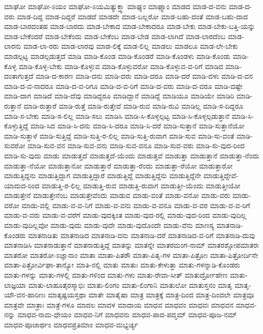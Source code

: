 {ಮಾಘೋ
ಮಾಘೋ-ಽಯಂ
ಮಾಘೋ-ಽಯಮಿತ್ಯುಕ್ತ್ವಾ
ಮಾಘ್ಯಂ
ಮಾಘ್ಯಾಂ
ಮಾಡದ
ಮಾಡ-ದ-ವನು
ಮಾಡ-ದ-ವರು
ಮಾಡ-ದಿದ್ದ
ಮಾಡ-ದಿದ್ದರೆ
ಮಾಡದೆ
ಮಾಡದೇ
ಮಾಡ-ಬಲ್ಲರೋ
ಮಾಡ-ಬಹು-ದಂತೆ
ಮಾಡ-ಬಹು-ದಾದ
ಮಾಡ-ಬಾರದಂತಹ
ಮಾಡ-ಬಾರದು
ಮಾಡ-ಬೇಕಾದ
ಮಾಡ-ಬೇಕಾದರೂ
ಮಾಡ-ಬೇಕು
ಮಾಡ-ಬೇಕು-ಬತ್ತಿ-ಯನ್ನು
ಮಾಡ-ಬೇಕೆಂದರೆ
ಮಾಡ-ಬೇಕೆಂದು
ಮಾಡ-ಬೇಕೆಂಬ
ಮಾಡ-ಬೇಡ
ಮಾಡ-ಲಾಗಿದೆ
ಮಾಡ-ಲಾರದೆಂಬ
ಮಾಡ-ಲಾರನು
ಮಾಡ-ಲಾ-ರರು
ಮಾಡ-ಲಾರವು
ಮಾಡ-ಲಿಕ್ಕೆ
ಮಾಡ-ಲಿಲ್ಲ
ಮಾಡಲು
ಮಾಡಲೂ
ಮಾಡ-ಲೇ-ಬೇಕು
ಮಾಡಲ್ಪಟ್ಟ
ಮಾಡಲ್ಪಡುತ್ತದೆ
ಮಾಡಿ
ಮಾಡಿ-ಕೊಂಡ
ಮಾಡಿ-ಕೊಂಡರೆ
ಮಾಡಿ-ಕೊಂಡಳು
ಮಾಡಿ-ಕೊಂಡು
ಮಾಡಿ-ಕೊಳ್ಳ
ಮಾಡಿ-ಕೊಳ್ಳ-ಬೇಕು
ಮಾಡಿ-ಕೊಳ್ಳುವ
ಮಾಡಿ-ಕೊಳ್ಳುವರೋ
ಮಾಡಿ-ಕೊಳ್ಳುವ-ವ-ರಿಗೆ
ಮಾಡಿದ
ಮಾಡಿ-ದಂತಾಗುತ್ತದೆ
ಮಾಡಿ-ದ-ಕಾರಣ
ಮಾಡಿ-ದನು
ಮಾಡಿ-ದರು
ಮಾಡಿ-ದರೂ
ಮಾಡಿ-ದರೆ
ಮಾಡಿ-ದಳು
ಮಾಡಿ-ದ-ವನ
ಮಾಡಿ-ದ-ವ-ನಾದರೂ
ಮಾಡಿ-ದ-ವ-ರಿಗೂ
ಮಾಡಿ-ದ-ವ-ರಿಗೆ
ಮಾಡಿ-ದ-ವರು
ಮಾಡಿ-ದ-ವರೂ
ಮಾಡಿ-ದಷ್ಟೇ
ಮಾಡಿ-ದಾಗ
ಮಾಡಿದೆ
ಮಾಡಿ-ದೆವು
ಮಾಡಿದ್ದರೂ
ಮಾಡಿದ್ದಾನೆ
ಮಾಡಿದ್ದೆ
ಮಾಡಿಯೂ
ಮಾಡಿಯೇ
ಮಾಡಿರಿ
ಮಾಡಿ-ರುತ್ತಾನೆ
ಮಾಡಿ-ರುತ್ತಾರೆ
ಮಾಡಿ-ರುತ್ತೆ
ಮಾಡಿ-ರುತ್ತೇವೆ
ಮಾಡಿ-ರುವ
ಮಾಡಿ-ರುವಿ
ಮಾಡಿಲ್ಲ
ಮಾಡಿ-ಸ-ದಿದ್ದರೂ
ಮಾಡಿ-ಸ-ಬೇಕು
ಮಾಡಿ-ಸ-ಲಿಲ್ಲ
ಮಾಡಿ-ಸಲು
ಮಾಡಿಸಿ
ಮಾಡಿ-ಸಿ-ಕೊಳ್ಳಲ್ಪಟ್ಟ
ಮಾಡಿ-ಸಿ-ಕೊಳ್ಳಲ್ಪಡುತ್ತಾನೆ
ಮಾಡಿ-ಸಿ-ಕೊಳ್ಳುತ್ತಿದ್ದೆ
ಮಾಡಿ-ಸಿದ
ಮಾಡಿ-ಸಿ-ದನು
ಮಾಡಿ-ಸಿ-ದರೂ
ಮಾಡಿ-ಸಿ-ದರೆ
ಮಾಡಿ-ಸುತ್ತಾನೆ
ಮಾಡಿ-ಸುತ್ತಾನೆಯೋ
ಮಾಡಿ-ಸುತ್ತಾಳೆ
ಮಾಡಿ-ಸುತ್ತಿದ್ದೆ
ಮಾಡಿ-ಸುತ್ತಿ-ರ-ಲಿಲ್ಲ
ಮಾಡಿ-ಸುತ್ತಿ-ರುವಾಗ
ಮಾಡಿ-ಸುವ
ಮಾಡಿ-ಸು-ವಂತೆ
ಮಾಡಿ-ಸುವರೋ
ಮಾಡಿ-ಸುವ-ವನ
ಮಾಡಿ-ಸುವ-ವನು
ಮಾಡಿ-ಸುವ-ವನೂ
ಮಾಡಿ-ಸುವ-ವರು
ಮಾಡಿ-ಸು-ವುದ-ರಿಂದ
ಮಾಡಿ-ಸು-ವುದು
ಮಾಡು
ಮಾಡುತ್ತದೆ
ಮಾಡುತ್ತದೆ-ಯೆಂದು
ಮಾಡುತ್ತವೆ
ಮಾಡುತ್ತಾ
ಮಾಡುತ್ತಾನೆ
ಮಾಡುತ್ತಾ-ನೆಂದು
ಮಾಡುತ್ತಾ-ನೆಯೋ
ಮಾಡುತ್ತಾನೋ
ಮಾಡುತ್ತಾರೆ
ಮಾಡುತ್ತಾ-ರೆಂದು
ಮಾಡುತ್ತಾ-ರೆಯೋ
ಮಾಡುತ್ತಾರೋ
ಮಾಡುತ್ತಿದ್ದನು
ಮಾಡುತ್ತಿದ್ದಾಗ
ಮಾಡುತ್ತಿದ್ದಾರೆ
ಮಾಡುತ್ತಿದ್ದೆ
ಮಾಡುತ್ತಿದ್ದೆನು
ಮಾಡುತ್ತಿದ್ದೆನೇ
ಮಾಡುತ್ತಿದ್ದೇವೆ-ಯಾದುದ-ರಿಂದ
ಮಾಡುತ್ತಿ-ರ-ಲಿಲ್ಲ
ಮಾಡುತ್ತಿ-ರುವ
ಮಾಡುತ್ತಿ-ರುವಾಗ
ಮಾಡುತ್ತೀ-ಯೆಂದು
ಮಾಡುತ್ತೀಯೋ
ಮಾಡುತ್ತೇನೆ
ಮಾಡುತ್ತೇನೆಂಬ
ಮಾಡುತ್ತೇವೆಂದು
ಮಾಡುವ
ಮಾಡು-ವಂತೆ
ಮಾಡು-ವನೋ
ಮಾಡು-ವರು
ಮಾಡು-ವರೋ
ಮಾಡು-ವಲ್ಲಿ
ಮಾಡು-ವ-ವ-ನಿಗೆ
ಮಾಡು-ವ-ವನು
ಮಾಡು-ವ-ವನೂ
ಮಾಡು-ವ-ವರ
ಮಾಡು-ವ-ವ-ರಿಗೆ
ಮಾಡು-ವ-ವರು
ಮಾಡು-ವ-ವರೆಗೆ
ಮಾಡು-ವುದಕ್ಕಿಂತ
ಮಾಡು-ವುದ-ರಲ್ಲಿ
ಮಾಡು-ವುದ-ರಿಂದ
ಮಾಡು-ವುದಿಲ್ಲ
ಮಾಡು-ವುದಿಲ್ಲವೋ
ಮಾಡು-ವುದು
ಮಾಡು-ವುದೇ
ಮಾಡು-ವುದೊಂದೇ
ಮಾಡು-ವೆನು
ಮಾಣಸ್ಯ
ಮಾತನಾಡಿ-ಕೊಂಡರು
ಮಾತನಾಡಿತು
ಮಾತನಾಡಿದ
ಮಾತನಾಡಿ-ದನು
ಮಾತನಾಡಿ-ದರೆ
ಮಾತನಾಡಿದ-ವ-ರಿಗೆ
ಮಾತನಾಡಿ-ದುವು
ಮಾತನಾಡಿಸಿ
ಮಾತನಾಡುತ್ತಾನೆ
ಮಾತನಾಡುತ್ತಿದ್ದೆ
ಮಾತನ್ನು
ಮಾತನ್ನೇ
ಮಾತರಮಂಗ-ನಾಮ್
ಮಾತರಶ್ಚೋಪಮಾತರಃ
ಮಾತರೋ
ಮಾತರೋ-ಽಜ್ಞಾನಾಂ
ಮಾತಾ
ಮಾತಾ-ಪಿತರೌ
ಮಾತಾ-ಪಿತೃ-ಗಳ
ಮಾತಾ-ಪಿತ್ರೋಃ
ಮಾತಾ-ಪಿತ್ರೋರ್ದಿನೇ
ಮಾತಾ-ಪಿತ್ರೋರ್ವಿಘಾ-ತಾನ್ಯೋ
ಮಾತಿ-ನಲ್ಲಿ
ಮಾತು
ಮಾತುಃ
ಮಾತು-ಕೇಳುತ್ತಾ
ಮಾತು-ಗಳನ್ನಾಡಿ-ಕೊಂಡರು
ಮಾತು-ಗಳನ್ನು
ಮಾತು-ಗಳಲ್ಲಿ
ಮಾತು-ಗಳಿಂದ
ಮಾತು-ಗಳು
ಮಾತು-ರೇವಾ-ಸೀತ್
ಮಾತುರ್ದ್ರೋಹೇಣ
ಮಾತು-ಲಾಜ್ಞಯಾ
ಮಾತು-ಲಾಹೂತೈರಸ್ಮಾಭಿಃ
ಮಾತು-ಲಿಂಗಂ
ಮಾತು-ಲಿಂಗಾನಿ
ಮಾತುಲೋ
ಮಾತುಸ್ತನಂ
ಮಾತೃ
ಮಾತೃ-ಯೌ-ವನ-ಹಾರಿಣಃ
ಮಾತೃಷ್ಟಯಸ್ತಥಾ
ಮಾತೇ
ಮಾತೈಷಾ
ಮಾತ್ರ
ಮಾತ್ರಕ್ಕೆ
ಮಾತ್ರ-ದಿಂದ
ಮಾತ್ರ-ದಿಂದಲೇ
ಮಾತ್ರವೂ
ಮಾತ್ರವೇ
ಮಾತ್ರಾಃ
ಮಾತ್ರೆ-ಗಳೂ
ಮಾದಲ
ಮಾದಳ
ಮಾದಾಯ
ಮಾಧವ
ಮಾಧವಂ
ಮಾಧವಃ
ಮಾಧವನ
ಮಾಧವ-ನನ್ನು
ಮಾಧವ-ನಾಮ-ಧೇಯಂ
ಮಾಧವ-ನಿಗೆ
ಮಾಧವನು
ಮಾಧವ-ಪಾದ-ಪದ್ಮಮ್
ಮಾಧವ-ಪೂಜ-ನಮ್
ಮಾಧವ-ಪೂಜಾರ್ಥಂ
ಮಾಧವಪ್ರತಿಮಾಂ
ಮಾಧವ-ಮಭ್ಯರ್ಚ್ಯ
}
